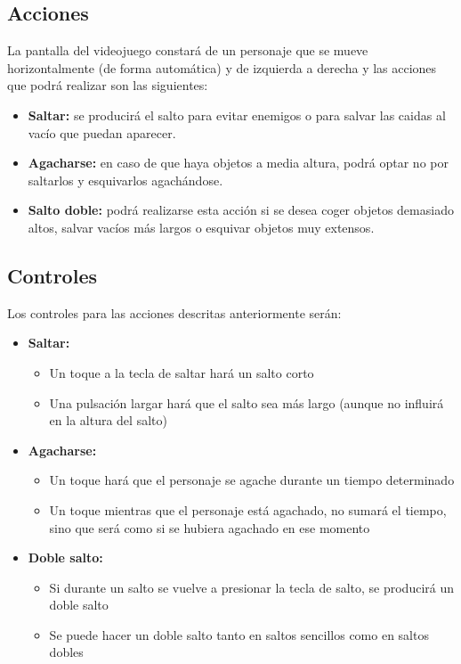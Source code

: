 \documentclass[palatino]{apuntes}
\begin{document}
\subsection{Acciones}
La pantalla del videojuego constará de un personaje que se mueve horizontalmente (de forma automática) y de izquierda a derecha y las acciones que podrá realizar son las siguientes:

\begin{itemize}
    \item \textbf{Saltar:} se producirá el salto para evitar enemigos o para salvar las caidas al vacío que puedan aparecer.
    \item \textbf{Agacharse:} en caso de que haya objetos a media altura, podrá optar no por saltarlos y esquivarlos agachándose.
    \item \textbf{Salto doble:} podrá realizarse esta acción si se desea coger objetos demasiado altos, salvar vacíos más largos o esquivar objetos muy extensos.
\end{itemize}



\subsection{Controles}
Los controles para las acciones descritas anteriormente serán:
\begin{itemize}
    \item \textbf{Saltar:}
        \begin{itemize}
            \item Un toque a la tecla de saltar hará un salto corto
            \item Una pulsación largar hará que el salto sea más largo (aunque no influirá en la altura del salto) 
        \end{itemize}
    \item \textbf{Agacharse:}
        \begin{itemize}
            \item Un toque hará que el personaje se agache durante un tiempo determinado
            \item Un toque mientras que el personaje está agachado, no sumará el tiempo, sino que será como si se hubiera agachado en ese momento
        \end{itemize}
    \item \textbf{Doble salto:}
        \begin{itemize}
            \item Si durante un salto se vuelve a presionar la tecla de salto, se producirá un doble salto
            \item Se puede hacer un doble salto tanto en saltos sencillos como en saltos dobles
        \end{itemize}
\end{itemize}
\end{document}
